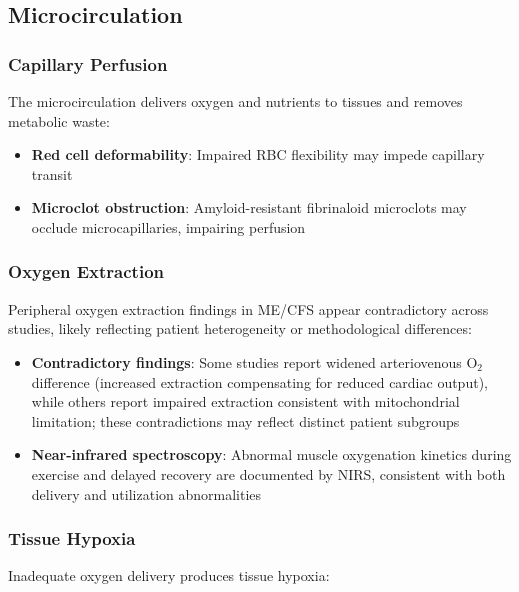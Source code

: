 \subsection{Microcirculation}
\label{sec:microcirculation}

\subsubsection{Capillary Perfusion}

The microcirculation delivers oxygen and nutrients to tissues and removes metabolic waste:

\begin{itemize}
    \item \textbf{Red cell deformability}: Impaired RBC flexibility may impede capillary transit~\cite{Saha2019}
    \item \textbf{Microclot obstruction}: Amyloid-resistant fibrinaloid microclots may occlude microcapillaries, impairing perfusion~\cite{Nunes2022microclots}
\end{itemize}

\subsubsection{Oxygen Extraction}

Peripheral oxygen extraction findings in ME/CFS appear contradictory across studies, likely reflecting patient heterogeneity or methodological differences:

\begin{itemize}
    \item \textbf{Contradictory findings}: Some studies report widened arteriovenous O$_2$ difference (increased extraction compensating for reduced cardiac output), while others report impaired extraction consistent with mitochondrial limitation; these contradictions may reflect distinct patient subgroups
    \item \textbf{Near-infrared spectroscopy}: Abnormal muscle oxygenation kinetics during exercise and delayed recovery are documented by NIRS, consistent with both delivery and utilization abnormalities~\cite{keller2024cpet}
\end{itemize}

\subsubsection{Tissue Hypoxia}

Inadequate oxygen delivery produces tissue hypoxia:

